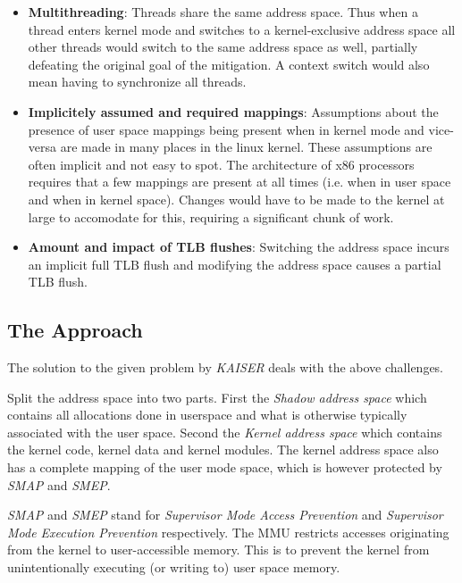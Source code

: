 \begin{itemize}
  \item{
    \textbf{Multithreading}:
    Threads share the same address space.
    Thus when a thread enters kernel mode and switches to a kernel-exclusive address space all other threads would switch to the same address space as well, partially defeating the original goal of the mitigation.
    A context switch would also mean having to synchronize all threads.
  }
  \item{
    \textbf{Implicitely assumed and required mappings}:
    Assumptions about the presence of user space mappings being present when in kernel mode and vice-versa are made in many places in the linux kernel.
    These assumptions are often implicit and not easy to spot.
    The architecture of x86 processors requires that a few mappings are present at all times (i.e. when in user space and when in kernel space).
    Changes would have to be made to the kernel at large to accomodate for this, requiring a significant chunk of work.
  }
  \item{
    \textbf{Amount and impact of TLB flushes}:
    Switching the address space incurs an implicit full TLB flush and modifying the address space causes a partial TLB flush. \cite{the-ginormous-intel-manual-volume-3}
  }
\end{itemize}

\subsection{The Approach}

The solution to the given problem by \textit{KAISER} deals with the above challenges.

Split the address space into two parts. First the \textit{Shadow address space} which contains all allocations done in userspace and what is otherwise typically associated with the user space.
Second the \textit{Kernel address space} which contains the kernel code, kernel data and kernel modules.
The kernel address space also has a complete mapping of the user mode space, which is however protected by \textit{SMAP} and \textit{SMEP}.

\textit{SMAP} and \textit{SMEP} stand for \textit{Supervisor Mode Access Prevention} and \textit{Supervisor Mode Execution Prevention} respectively.
The MMU restricts accesses originating from the kernel to user-accessible memory.
This is to prevent the kernel from unintentionally executing (or writing to) user space memory.\cite{smap}

